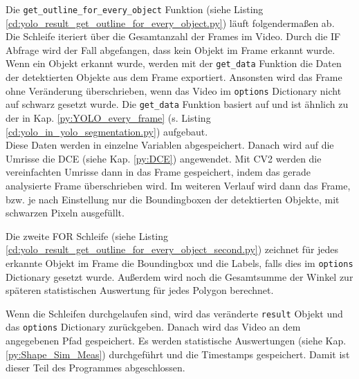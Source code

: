 {	Die \lstinline|get_outline_for_every_object| Funktion \ifimportant (siehe Listing \ref{cd:yolo_result_get_outline_for_every_object.py}) \fi läuft folgendermaßen ab. \\
	Die Schleife iteriert über die Gesamtanzahl der Frames im Video. Durch die IF Abfrage wird der Fall abgefangen, dass kein Objekt im Frame erkannt wurde. Wenn ein Objekt erkannt wurde, werden mit der \lstinline|get_data| Funktion die Daten der detektierten Objekte aus dem Frame exportiert. Ansonsten wird das Frame ohne Veränderung überschrieben, wenn das Video im \lstinline|options| Dictionary nicht auf schwarz gesetzt wurde. Die \lstinline|get_data| Funktion basiert auf \citeauthor{Canu_pysource} \citep{Canu_pysource} und ist ähnlich zu der in Kap. \ref{py:YOLO_every_frame} \ifimportant (s. Listing \ref{cd:yolo_in_yolo_segmentation.py}) \fi aufgebaut. \\
	Diese Daten werden in einzelne Variablen abgespeichert. Danach wird auf die Umrisse die DCE (siehe Kap. \ref{py:DCE}) angewendet. Mit CV2 werden die vereinfachten Umrisse dann in das Frame gespeichert, indem das gerade analysierte Frame überschrieben wird. Im weiteren Verlauf wird dann das Frame, bzw. je nach Einstellung nur die Boundingboxen der detektierten Objekte, mit schwarzen Pixeln ausgefüllt. \\
	\ifimportant
	
	\fi
	Die zweite FOR Schleife \ifimportant (siehe Listing \ref{cd:yolo_result_get_outline_for_every_object_second.py}) \fi zeichnet für jedes erkannte Objekt im Frame die Boundingbox und die Labels, falls dies im \lstinline|options| Dictionary gesetzt wurde. Außerdem wird noch die Gesamtsumme der Winkel  zur späteren statistischen Auswertung für jedes Polygon berechnet.
	\ifimportant
	
	\fi
	Wenn die Schleifen durchgelaufen sind, wird das veränderte \lstinline|result| Objekt und das \lstinline|options| Dictionary zurückgeben. Danach wird das Video an dem angegebenen Pfad gespeichert. Es werden statistische Auswertungen (siehe Kap. \ref{py:Shape_Sim_Meas}) durchgeführt und die Timestamps gespeichert. Damit ist dieser Teil des  Programmes abgeschlossen. \\
	}

